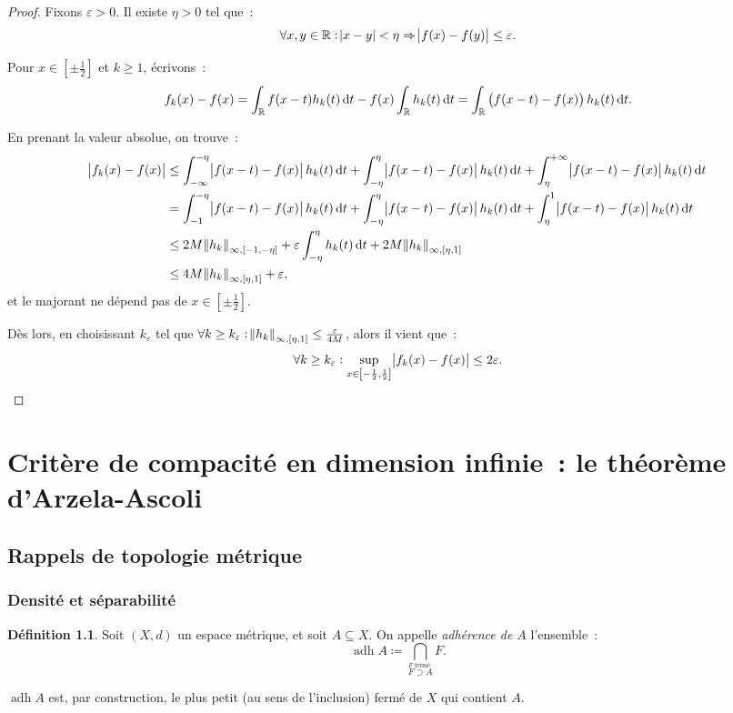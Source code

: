 \documentclass{report}
\theoremstyle{definition}
\newtheorem{déf}[thm]{Définition}
\theoremstyle{remark}
\newcommand{\R}{\mathbb R}
\DeclareMathOperator{\adh}{adh}
\newcommand{\minfty}{{-\infty}}
\newcommand{\pinfty}{{+\infty}}
\begin{document}
\begin{proof}
			Fixons $\varepsilon > 0$. Il existe $\eta > 0$ tel que~:
			\[\forall x, y \in \R : \abs {x-y} < \eta \Rightarrow \abs {f(x)-f(y)} \leq \varepsilon.\]

			Pour $x \in \left[\pm\frac 12\right]$ et $k \geq 1$, écrivons~:
			\[f_k(x)-f(x) = \int_\R f(x-t)h_k(t)\dif t - f(x)\int_\R h_k(t)\dif t = \int_\R \left(f(x-t)-f(x)\right)h_k(t)\dif t.\]

			En prenant la valeur absolue, on trouve~:
			\begin{align*}
				\abs {f_k(x)-f(x)}
					&\leq \int_\minfty^{-\eta}\abs {f(x-t)-f(x)}h_k(t)\dif t + \int_{-\eta}^{\eta}\abs {f(x-t)-f(x)}h_k(t)\dif t + \int_\eta^\pinfty\abs {f(x-t)-f(x)}h_k(t)\dif t \\
				&= \int_{-1}^{-\eta}\abs {f(x-t)-f(x)}h_k(t)\dif t + \int_{-\eta}^{\eta}\abs {f(x-t)-f(x)}h_k(t)\dif t + \int_\eta^1\abs {f(x-t)-f(x)}h_k(t)\dif t \\
				&\leq 2M\norm {h_k}_{\infty, [-1, -\eta]} + \varepsilon\int_{-\eta}^\eta h_k(t)\dif t + 2M\norm {h_k}_{\infty, [\eta, 1]} \\
				&\leq 4M\norm {h_k}_{\infty, [\eta, 1]} + \varepsilon,
			\end{align*}
			et le majorant ne dépend pas de $x \in \left[\pm\frac 12\right]$.

			Dès lors, en choisissant $k_\varepsilon$ tel que $\forall k \geq k_\varepsilon : \norm {h_k}_{\infty, [\eta, 1]} \leq \frac \varepsilon{4M}$, alors il vient que~:
			\[\forall k \geq k_\varepsilon : \sup_{x \in \left[-\frac 12, \frac 12\right]}\abs {f_k(x)-f(x)} \leq 2\varepsilon.\]
			\end{proof}


\chapter{Critère de compacité en dimension infinie~: le théorème d'Arzela-Ascoli}
	\section{Rappels de topologie métrique}
		\subsection{Densité et séparabilité}
			\begin{déf} Soit $(X, d)$ un espace métrique, et soit $A \subseteq X$. On appelle \textit{adhérence de $A$} l'ensemble~:
			\[\adh A \coloneqq \bigcap_{\overset {F \text{ fermé }}{F \supset A}} F.\]

			$\adh A$ est, par construction, le plus petit (au sens de l'inclusion) fermé de $X$ qui contient $A$.
			\end{déf}
\end{document}
